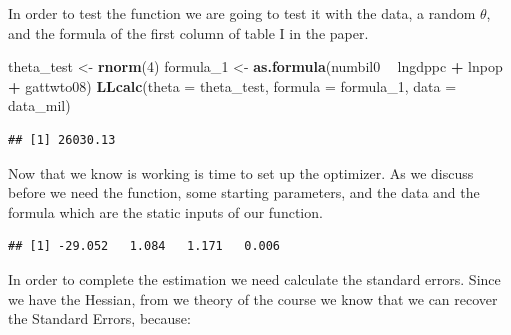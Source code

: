 \documentclass[]{book}
\newenvironment{Shaded}{\begin{snugshade}}{\end{snugshade}}
\newcommand{\KeywordTok}[1]{\textcolor[rgb]{0.13,0.29,0.53}{\textbf{#1}}}
\newcommand{\DataTypeTok}[1]{\textcolor[rgb]{0.13,0.29,0.53}{#1}}
\newcommand{\DecValTok}[1]{\textcolor[rgb]{0.00,0.00,0.81}{#1}}
\newcommand{\StringTok}[1]{\textcolor[rgb]{0.31,0.60,0.02}{#1}}
\newcommand{\OtherTok}[1]{\textcolor[rgb]{0.56,0.35,0.01}{#1}}
\newcommand{\OperatorTok}[1]{\textcolor[rgb]{0.81,0.36,0.00}{\textbf{#1}}}
\newcommand{\NormalTok}[1]{#1}
\begin{document}
In order to test the function we are going to test it with the data, a
random \(\theta\), and the formula of the first column of table I in the
paper.

\begin{Shaded}
\begin{Highlighting}[]
\NormalTok{theta_test <-}\StringTok{ }\KeywordTok{rnorm}\NormalTok{(}\DecValTok{4}\NormalTok{)}
\NormalTok{formula_}\DecValTok{1}\NormalTok{ <-}\StringTok{ }\KeywordTok{as.formula}\NormalTok{(numbil0 }\OperatorTok{~}\StringTok{ }\NormalTok{lngdppc }\OperatorTok{+}\StringTok{ }\NormalTok{lnpop }\OperatorTok{+}\StringTok{ }\NormalTok{gattwto08)}
\KeywordTok{LLcalc}\NormalTok{(}\DataTypeTok{theta =}\NormalTok{ theta_test, }\DataTypeTok{formula =}\NormalTok{ formula_}\DecValTok{1}\NormalTok{, }\DataTypeTok{data =}\NormalTok{ data_mil)}
\end{Highlighting}
\end{Shaded}

\begin{verbatim}
## [1] 26030.13
\end{verbatim}

Now that we know is working is time to set up the optimizer. As we
discuss before we need the function, some starting parameters, and the
data and the formula which are the static inputs of our function.

\begin{Shaded}
\end{Shaded}

\begin{verbatim}
## [1] -29.052   1.084   1.171   0.006
\end{verbatim}

In order to complete the estimation we need calculate the standard
errors. Since we have the Hessian, from we theory of the course we know
that we can recover the Standard Errors, because:
\end{document}
